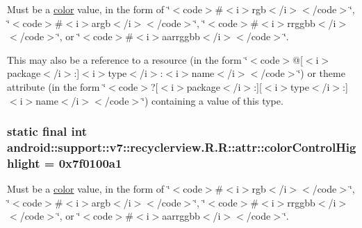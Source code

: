 Must be a \hyperlink{classandroid_1_1support_1_1v7_1_1recyclerview_1_1_r_1_1color}{color} value, in the form of \char`\"{}$<$code$>$\#$<$i$>$rgb$<$/i$>$$<$/code$>$\char`\"{}, \char`\"{}$<$code$>$\#$<$i$>$argb$<$/i$>$$<$/code$>$\char`\"{}, \char`\"{}$<$code$>$\#$<$i$>$rrggbb$<$/i$>$$<$/code$>$\char`\"{}, or \char`\"{}$<$code$>$\#$<$i$>$aarrggbb$<$/i$>$$<$/code$>$\char`\"{}. 

This may also be a reference to a resource (in the form \char`\"{}$<$code$>$@\mbox{[}$<$i$>$package$<$/i$>$:\mbox{]}$<$i$>$type$<$/i$>$:$<$i$>$name$<$/i$>$$<$/code$>$\char`\"{}) or theme attribute (in the form \char`\"{}$<$code$>$?\mbox{[}$<$i$>$package$<$/i$>$:\mbox{]}\mbox{[}$<$i$>$type$<$/i$>$:\mbox{]}$<$i$>$name$<$/i$>$$<$/code$>$\char`\"{}) containing a value of this type. \hypertarget{classandroid_1_1support_1_1v7_1_1recyclerview_1_1_r_1_1attr_f3efda41d6f85f45c0ad0720650ec9ae}{
\subsubsection[{colorControlHighlight}]{\setlength{\rightskip}{0pt plus 5cm}static final int android::support::v7::recyclerview.R.R::attr::colorControlHighlight = 0x7f0100a1}}
\label{classandroid_1_1support_1_1v7_1_1recyclerview_1_1_r_1_1attr_f3efda41d6f85f45c0ad0720650ec9ae}


Must be a \hyperlink{classandroid_1_1support_1_1v7_1_1recyclerview_1_1_r_1_1color}{color} value, in the form of \char`\"{}$<$code$>$\#$<$i$>$rgb$<$/i$>$$<$/code$>$\char`\"{}, \char`\"{}$<$code$>$\#$<$i$>$argb$<$/i$>$$<$/code$>$\char`\"{}, \char`\"{}$<$code$>$\#$<$i$>$rrggbb$<$/i$>$$<$/code$>$\char`\"{}, or \char`\"{}$<$code$>$\#$<$i$>$aarrggbb$<$/i$>$$<$/code$>$\char`\"{}. 

